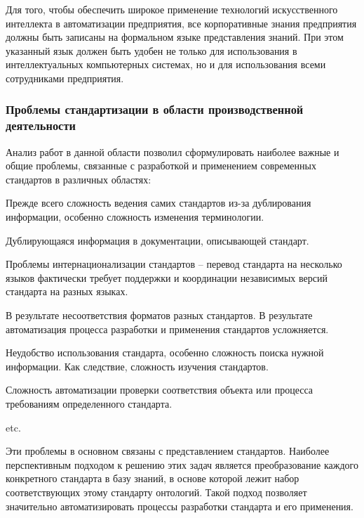 Для того, чтобы обеспечить широкое применение технологий искусственного интеллекта в автоматизации предприятия, все корпоративные знания предприятия должны быть записаны на формальном языке представления знаний. При этом указанный язык должен быть удобен не только для использования в интеллектуальных компьютерных системах, но и для использования всеми сотрудниками предприятия.

\subsubsection{Проблемы стандартизации в области производственной деятельности}
\label{sec_chapter_enterprise_standard_examples_production}


Анализ работ в данной области позволил сформулировать наиболее важные и общие проблемы, связанные с разработкой и применением современных стандартов в различных областях:
\begin{textitemize}
    \item Прежде всего сложность ведения самих стандартов из-за дублирования информации, особенно сложность изменения терминологии.
    \item Дублирующаяся информация в документации, описывающей стандарт.
    \item Проблемы интернационализации стандартов -- перевод стандарта на несколько языков фактически требует поддержки и координации независимых версий стандарта на разных языках.
    \item В результате несоответствия форматов разных стандартов. В результате автоматизация процесса разработки и применения стандартов усложняется.
    \item Неудобство использования стандарта, особенно сложность поиска нужной информации. Как следствие, сложность изучения стандартов.
    \item Сложность автоматизации проверки соответствия объекта или процесса требованиям определенного стандарта.
    \item etc.
\end{textitemize}

Эти проблемы в основном связаны с представлением стандартов. Наиболее перспективным подходом к решению этих задач является преобразование каждого конкретного стандарта в базу знаний, в основе которой лежит набор соответствующих этому стандарту онтологий. Такой подход позволяет значительно автоматизировать процессы разработки стандарта и его применения.

